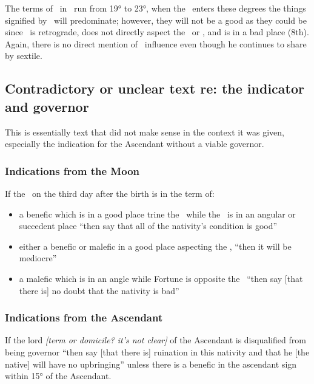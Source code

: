 The terms of \Jupiter\, in \Scorpio\, run from 19° to 23°, when the \ASC\, enters these degrees the things signified by \Jupiter\, will predominate; however, they will not be a good as they could be since \Jupiter\, is retrograde, does not directly aspect the \Moon\, or \ASC, and is in a bad place (8th). Again, there is no direct mention of \Mars\, influence even though he continues to share by sextile.

\newpage
\subsection{Contradictory or unclear text re: the indicator and governor}
\begin{mdframed}[backgroundcolor=cyan!5, rightmargin=1em, leftmargin=1em]
This is essentially text that did not make sense in the context it was given, especially the indication for the Ascendant without a viable governor.
\end{mdframed}

\subsubsection{Indications from the Moon}
If  the \Moon\, on the third day after the birth is in the term of:

\begin{itemize}[topsep=0em,itemsep=0em]
\item a benefic which is in a good place trine the \Moon\, while the \Moon\, is in an angular or succedent place ``then say that all of the nativity's condition is good''

\item either  a benefic or malefic in a good place aspecting the \Moon, ``then it will be mediocre''

\item a  malefic which is in an angle while Fortune is opposite the \Moon\, ``then say [that there is] no doubt that the nativity is bad''
\end{itemize}

\subsubsection{Indications from the Ascendant}
If  the lord \textsl{[term or domicile? it's not clear]} of the Ascendant is disqualified from being governor ``then say [that there is] ruination in this nativity and that he [the native] will have no upbringing'' unless there is a benefic in the ascendant sign within 15° of the Ascendant.
